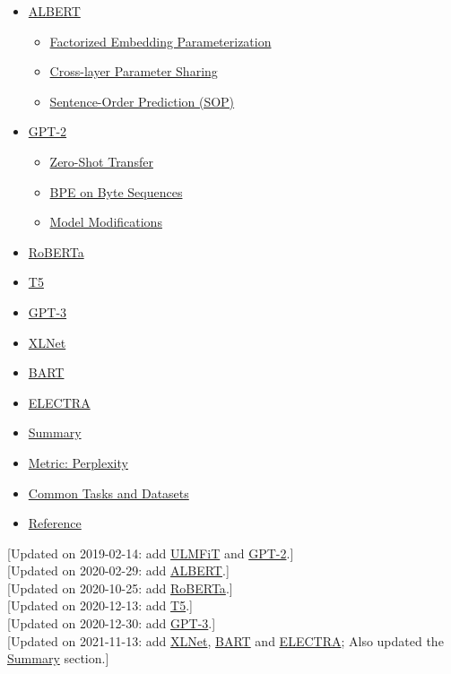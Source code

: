 \begin{itemize}
  \begin{itemize}
  \tightlist
  \item
    \hyperref[pre-training-tasks]{Pre-training Tasks}
  \item
    \hyperref[input-embedding]{Input Embedding}
  \item
    \hyperref[use-bert-in-downstream-tasks]{Use BERT in Downstream Tasks}
  \end{itemize}
\item
  \hyperref[albert]{ALBERT}

  \begin{itemize}
  \tightlist
  \item
    \hyperref[factorized-embedding-parameterization]{Factorized Embedding Parameterization}
  \item
    \hyperref[cross-layer-parameter-sharing]{Cross-layer Parameter Sharing}
  \item
    \hyperref[sentence-order-prediction-sop]{Sentence-Order Prediction (SOP)}
  \end{itemize}
\item
  \hyperref[gpt-2]{GPT-2}

  \begin{itemize}
  \tightlist
  \item
    \hyperref[zero-shot-transfer]{Zero-Shot Transfer}
  \item
    \hyperref[bpe-on-byte-sequences]{BPE on Byte Sequences}
  \item
    \hyperref[model-modifications]{Model Modifications}
  \end{itemize}
\item
  \hyperref[roberta]{RoBERTa}
\item
  \hyperref[t5]{T5}
\item
  \hyperref[gpt-3]{GPT-3}
\item
  \hyperref[xlnet]{XLNet}
\item
  \hyperref[bart]{BART}
\item
  \hyperref[electra]{ELECTRA}
\item
  \hyperref[summary]{Summary}
\item
  \hyperref[metric-perplexity]{Metric: Perplexity}
\item
  \hyperref[common-tasks-and-datasets]{Common Tasks and Datasets}
\item
  \hyperref[reference]{Reference}
\end{itemize}

{{[}Updated on 2019-02-14: add \hyperref[ulmfit]{ULMFiT} and \hyperref[gpt-2]{GPT-2}.{]}}\\
{{[}Updated on 2020-02-29: add \hyperref[albert]{ALBERT}.{]}}\\
{{[}Updated on 2020-10-25: add \hyperref[roberta]{RoBERTa}.{]}}\\
{{[}Updated on 2020-12-13: add \hyperref[t5]{T5}.{]}}\\
{{[}Updated on 2020-12-30: add \hyperref[gpt-3]{GPT-3}.{]}}\\
{{[}Updated on 2021-11-13: add \hyperref[xlnet]{XLNet}, \hyperref[bart]{BART} and \hyperref[electra]{ELECTRA}; Also updated the \hyperref[summary]{Summary} section.{]}}

